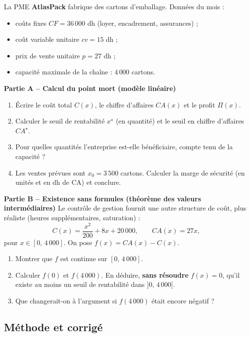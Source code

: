\documentclass[12pt,a4paper]{article}
\begin{document}
\begin{exobox}
La PME \textbf{AtlasPack} fabrique des cartons d'emballage. Données du mois :
\begin{itemize}[leftmargin=1.2cm]
  \item coûts fixes $CF = 36\,000$ dh (loyer, encadrement, assurances) ;
  \item coût variable unitaire $cv = 15$ dh ;
  \item prix de vente unitaire $p = 27$ dh ;
  \item capacité maximale de la chaîne : $4\,000$ cartons.
\end{itemize}

\textbf{Partie A -- Calcul du point mort (modèle linéaire)}
\begin{enumerate}[label=\alph*)]
  \item Écrire le coût total $C(x)$, le chiffre d'affaires $CA(x)$ et le profit $\Pi(x)$.
  \item Calculer le seuil de rentabilité $x^\star$ (en quantité) et le seuil en chiffre d'affaires $CA^\star$.
  \item Pour quelles quantités l'entreprise est-elle bénéficiaire, compte tenu de la capacité ?
  \item Les ventes prévues sont $x_0 = 3\,500$ cartons. Calculer la marge de sécurité (en unités et en dh de CA) et conclure.
\end{enumerate}

\textbf{Partie B -- Existence sans formules (théorème des valeurs intermédiaires)}
Le contrôle de gestion fournit une autre structure de coût, plus réaliste (heures supplémentaires, saturation) :
$$C(x) = \frac{x^2}{200} + 8x + 20\,000, \qquad CA(x) = 27x,$$
pour $x\in[0,\,4\,000]$. On pose $f(x)=CA(x)-C(x)$.
\begin{enumerate}[label=\alph*), resume]
  \item Montrer que $f$ est continue sur $[0,\,4\,000]$.
  \item Calculer $f(0)$ et $f(4\,000)$. En déduire, \textbf{sans résoudre} $f(x)=0$, qu'il existe au moins un seuil de rentabilité dans $]0,\,4\,000[$.
  \item Que changerait-on à l'argument si $f(4\,000)$ était encore négatif ?
\end{enumerate}
\end{exobox}

\subsection{Méthode et corrigé}
\end{document}
